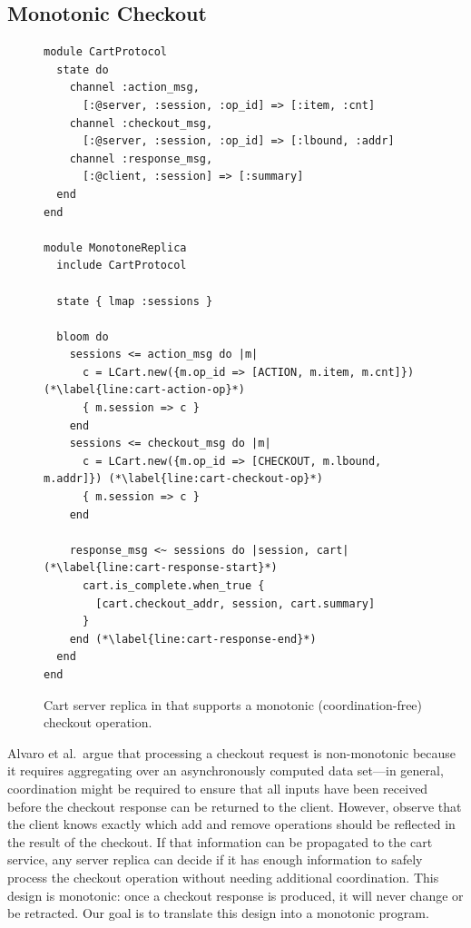 \subsection{Monotonic Checkout}
\label{sec:monotone-checkout}

\begin{figure}[t]
\begin{scriptsize}
\begin{lstlisting}
module CartProtocol
  state do
    channel :action_msg,
      [:@server, :session, :op_id] => [:item, :cnt]
    channel :checkout_msg,
      [:@server, :session, :op_id] => [:lbound, :addr]
    channel :response_msg,
      [:@client, :session] => [:summary]
  end
end

module MonotoneReplica
  include CartProtocol

  state { lmap :sessions }

  bloom do
    sessions <= action_msg do |m|
      c = LCart.new({m.op_id => [ACTION, m.item, m.cnt]}) (*\label{line:cart-action-op}*)
      { m.session => c }
    end
    sessions <= checkout_msg do |m|
      c = LCart.new({m.op_id => [CHECKOUT, m.lbound, m.addr]}) (*\label{line:cart-checkout-op}*)
      { m.session => c }
    end

    response_msg <~ sessions do |session, cart| (*\label{line:cart-response-start}*)
      cart.is_complete.when_true {
        [cart.checkout_addr, session, cart.summary]
      }
    end (*\label{line:cart-response-end}*)
  end
end
\end{lstlisting}
\end{scriptsize}
\caption{Cart server replica in \lang that supports a monotonic
  (coordination-free) checkout operation.}
\label{fig:monotone-cart}
\end{figure}

Alvaro et al.\ argue that processing a checkout request is non-monotonic because
it requires aggregating over an asynchronously computed data set---in general,
coordination might be required to ensure that all inputs have been received
before the checkout response can be returned to the client. However, observe
that the client knows exactly which add and remove operations should be
reflected in the result of the checkout. If that information can be propagated
to the cart service, any server replica can decide if it has enough information
to safely process the checkout operation without needing additional
coordination. This design is monotonic: once a checkout response is produced, it
will never change or be retracted. Our goal is to translate this design into a
monotonic \lang program.

